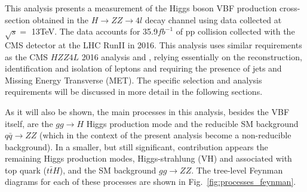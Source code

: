 This analysis presents a measurement of the Higgs boson VBF production cross-section obtained in the $H \rightarrow ZZ \rightarrow 4l$ decay channel using data collected at $\sqrt{s}=$ 13TeV. The data accounts for 35.9$fb^{-1}$ of pp collision collected with the CMS detector at the LHC RunII in 2016. This analysis uses similar requirements as the CMS $HZZ4L$ 2016 analysis \cite{bib:CMS-AN-16-442} and \cite{bib:CMS-AN-16-328}, relying essentially on the reconstruction, identification and isolation of leptons and requiring the presence of jets and Missing Energy Transverse (MET). The specific selection and analysis requirements will be discussed in more detail in the following sections.

As it will also be shown, the main processes in this analysis, besides the VBF itself, are the $gg \rightarrow H$ Higgs production mode and the reducible SM background $q\bar{q} \rightarrow ZZ$ (which in the context of the present analysis become a non-reducible background). In a smaller, but still significant, contribution appears the remaining Higgs production modes, Higgs-strahlung (VH) and associated with top quark ($t\bar{t}H$), and the SM background $gg \rightarrow ZZ$. The tree-level Feynman diagrams for each of these processes are shown in Fig.~\ref{fig:processes_feynman}.

